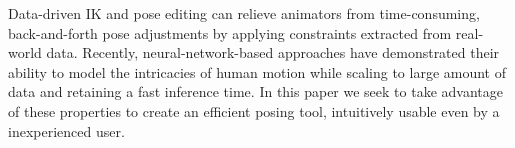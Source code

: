 Data-driven IK and pose editing can relieve animators from time-consuming, back-and-forth pose adjustments by applying constraints extracted from real-world data. Recently, neural-network-based approaches have demonstrated their ability to model the intricacies of human motion while scaling to large amount of data and retaining a fast inference time. In this paper we seek to take advantage of these properties to create an efficient posing tool, intuitively usable even by a inexperienced user.